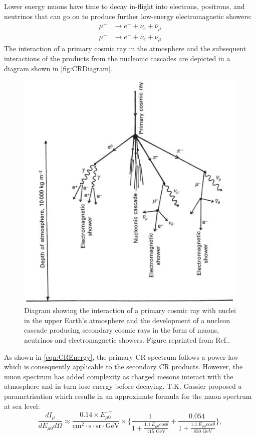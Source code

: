 Lower energy muons have time to decay in-flight into electrons, positrons, and neutrinos that can go on to produce further low-energy electromagnetic showers:
\begin{equation}
\begin{split}    
    \mu^+&\rightarrow e^++\nu_e+\bar\nu_\mu \\
    \mu^-&\rightarrow e^-+\bar\nu_e+\nu_\mu
\end{split}
\end{equation}
The interaction of a primary cosmic ray in the atmosphere and the subsequent interactions of the products from the nucleonic cascades are depicted in a diagram shown in \autoref{fig:CRDiagram}.
\begin{figure}[ht!]
    \centering
    \includegraphics[width=0.7\linewidth]{figures/Muons/MuonShower.png}
    \caption{Diagram showing the interaction of a primary cosmic ray with nuclei in the upper Earth's atmosphere and the development of a nucleon cascade producing secondary cosmic rays in the form of muons, neutrinos and electromagnetic showers. Figure reprinted from Ref.\cite{Longair_2011}.}
    \label{fig:CRDiagram}
\end{figure}
As shown in \autoref{eqn:CREnergy}, the primary CR spectrum follows a power-law which is consequently applicable to the secondary CR products. However, the muon spectrum has added complexity as charged mesons interact with the atmosphere and in turn lose energy before decaying. T.K. Gassier proposed a parametrisation \cite{Gaisser_Engel_Resconi_2016} which results in an approximate formula for the muon spectrum at sea level:
\begin{equation}
    \label{eqn:MuonIntensitySurfaceEarth1}
    \frac{dI_\mu}{dE_{\mu0}d\Omega}\approx\frac{0.14\times E^{-\gamma}_{\mu0}}{\text{cm}^2\cdot\text{s}\cdot\text{sr}\cdot\text{GeV}}\times\Biggl\{\frac{1}{1+\frac{1.1\:E_{\mu0}\text{cos}\theta}{115\text{ GeV}}}+\frac{0.054}{1+\frac{1.1\:E_{\mu0}\text{cos}\theta}{850\text{ GeV}}}\Biggl\},
\end{equation}
